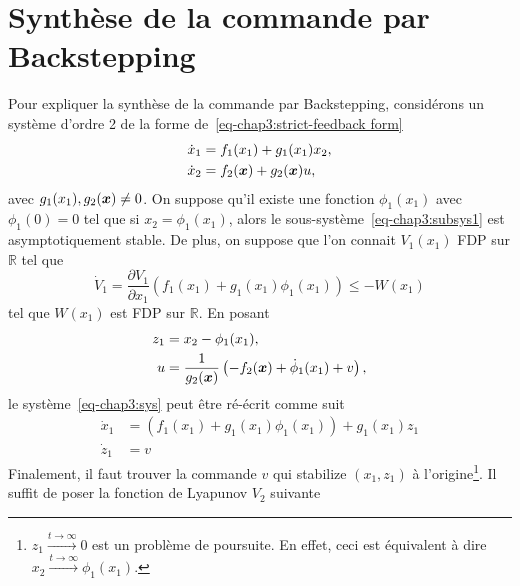 \section{Synthèse de la commande par Backstepping}
Pour expliquer la synthèse de la commande par Backstepping, considérons un système d'ordre 2 de la forme de~\eqref{eq-chap3:strict-feedback form}
	\begin{subequations}\label{eq-chap3:sys}
		\begin{align}
			\label{eq-chap3:subsys1}	\dot{x}_1 &= f_1(x_1) + g_1(x_1)x_2,\\
			\label{eq-chap3:subsys2}	\dot{x}_2 &= f_2(\bm{x}) + g_2(\bm{x})u,
		\end{align}
	\end{subequations}
avec $g_1(x_1),g_2(\bm{x})\neq0$. On suppose qu'il existe une fonction $\phi_1(x_1)$ avec $\phi_1(0)=0$ tel que si $x_2 = \phi_1(x_1)$, alors le sous-système~\eqref{eq-chap3:subsys1} est asymptotiquement stable. De plus, on suppose que l'on connait $V_1(x_1)$ FDP sur $\mathbb{R}$ tel que 
\begin{equation}
	\dot{V}_1=\frac{\partial V_1}{\partial x_1}\left(f_1(x_1) + g_1(x_1)\phi_1(x_1)\right)\leq - W(x_1)
\end{equation}
tel que $W(x_1)$ est FDP sur $\mathbb{R}$. En posant 
\begin{align}\label{eq-chap3:change of variables z}
	z_1&=x_2-\phi_1(x_1),\\
	\label{eq-chap3:change of variables u}u &= \frac{1}{g_2(\bm{x})}\left(-f_2(\bm{x}) +\dot{\phi}_1(x_1) + v\right),
\end{align}
  le système~\eqref{eq-chap3:sys} peut être ré-écrit comme suit 
	\begin{subequations}\label{eq-chap3:sys_modif}
	\begin{align}
			\dot{x}_1 &= \left(f_1(x_1) + g_1(x_1)\phi_1(x_1)\right) + g_1(x_1)z_1\\
			\dot{z}_1 &= v
	\end{align}
	\end{subequations}
Finalement, il faut trouver la commande $v$ qui stabilize  $(x_1,z_1)$ à l'origine\footnote{$z_1\overset{t\rightarrow\infty}{\longrightarrow}0$ est un problème de poursuite. En effet, ceci est équivalent à dire $ x_2\overset{t\rightarrow\infty}{\longrightarrow}\phi_1(x_1)$.}. Il suffit de poser la fonction de Lyapunov $V_2$ suivante 
